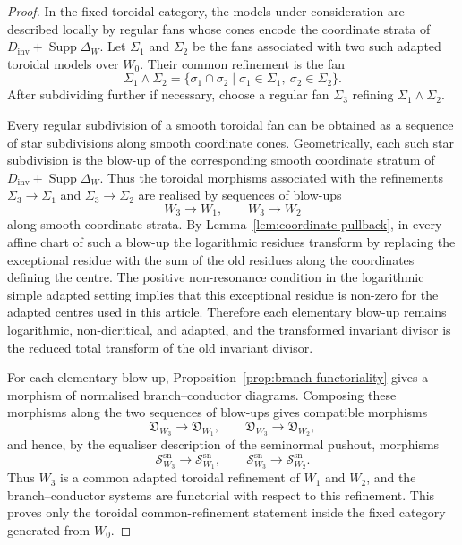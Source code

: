 \documentclass[11pt]{amsart}
\numberwithin{equation}{section}
\theoremstyle{plain}
\theoremstyle{definition}
\newcommand{\Supp}{\operatorname{Supp}}
\newcommand{\sn}{\mathrm{sn}}
\newcommand{\Dinv}{D_{\mathrm{inv}}}
\begin{document}
\begin{proof}
In the fixed toroidal category, the models under consideration are described locally by regular fans whose cones encode the coordinate strata of \(\Dinv+\Supp\Delta_W\). Let \(\Sigma_1\) and \(\Sigma_2\) be the fans associated with two such adapted toroidal models over \(W_0\). Their common refinement is the fan
\[
\Sigma_1\wedge \Sigma_2
=
\{\sigma_1\cap\sigma_2\mid \sigma_1\in\Sigma_1,\ \sigma_2\in\Sigma_2\}.
\]
After subdividing further if necessary, choose a regular fan \(\Sigma_3\) refining \(\Sigma_1\wedge\Sigma_2\).

Every regular subdivision of a smooth toroidal fan can be obtained as a sequence of star subdivisions along smooth coordinate cones. Geometrically, each such star subdivision is the blow-up of the corresponding smooth coordinate stratum of \(\Dinv+\Supp\Delta_W\). Thus the toroidal morphisms associated with the refinements \(\Sigma_3\to\Sigma_1\) and \(\Sigma_3\to\Sigma_2\) are realised by sequences of blow-ups
\[
W_3\longrightarrow W_1,
\qquad
W_3\longrightarrow W_2
\]
along smooth coordinate strata.
By Lemma~\ref{lem:coordinate-pullback}, in every affine chart of such a blow-up the logarithmic residues transform by replacing the exceptional residue with the sum of the old residues along the coordinates defining the centre. The positive non-resonance condition in the logarithmic simple adapted setting implies that this exceptional residue is non-zero for the adapted centres used in this article. Therefore each elementary blow-up remains logarithmic, non-dicritical, and adapted, and the transformed invariant divisor is the reduced total transform of the old invariant divisor.

For each elementary blow-up, Proposition~\ref{prop:branch-functoriality} gives a morphism of normalised branch--conductor diagrams. Composing these morphisms along the two sequences of blow-ups gives compatible morphisms
\[
\mathfrak D_{W_3}\longrightarrow \mathfrak D_{W_1},
\qquad
\mathfrak D_{W_3}\longrightarrow \mathfrak D_{W_2},
\]
and hence, by the equaliser description of the seminormal pushout, morphisms
\[
\mathscr S_{W_3}^{\sn}\longrightarrow \mathscr S_{W_1}^{\sn},
\qquad
\mathscr S_{W_3}^{\sn}\longrightarrow \mathscr S_{W_2}^{\sn}.
\]
Thus \(W_3\) is a common adapted toroidal refinement of \(W_1\) and \(W_2\), and the branch--conductor systems are functorial with respect to this refinement.
This proves only the toroidal common-refinement statement inside the fixed category generated from \(W_0\).
\end{proof}
\end{document}
